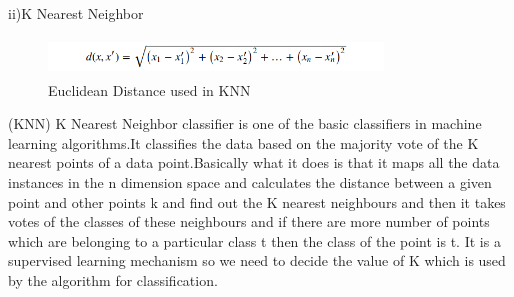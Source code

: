 \documentclass[conference,compsoc]{IEEEtran}
\begin{document}
\newline

ii)K Nearest Neighbor
\newline
\par
\begin{figure}[H]
\centering
\includegraphics[width=3.5in,height=0.4in]{knn1.png}
\caption{Euclidean Distance used in KNN}
\label{fig_error}

\end{figure}  
(KNN) K Nearest Neighbor classifier is one of the basic classifiers in  machine learning algorithms.It classifies the data based on the majority vote of the K nearest points of a data point.Basically what it does is that it maps all the data instances in the n dimension space and calculates the distance between a given point and other points  k and find out the K nearest neighbours  and then it takes votes of the classes of these neighbours and if there are more number of points which are belonging to a particular class t then the class of the point is t.
It is a supervised learning mechanism so we need to decide the value of K which is used by the algorithm for classification.
\newline
\end{document}
